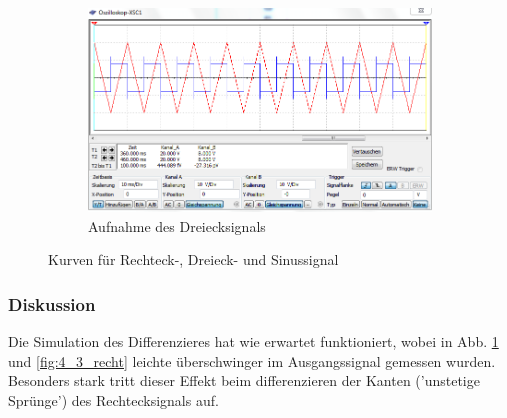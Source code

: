 \documentclass[12pt,a4paper]{article}
\begin{document}
\begin{figure}[H]
        \hfill
        \begin{subfigure}[t]{0.28\textwidth}
                \includegraphics[width=\textwidth , scale = 0.4]{4_3_drei.PNG}
                \caption[Aufnahme des Dreiecksignals]{Aufnahme des Dreiecksignals}
  				\label{fig:4_3_drei}
        \end{subfigure}
        \caption{Kurven  für Rechteck-, Dreieck- und Sinussignal}
        \label{fig:4_3}
\end{figure}

\subsubsection{Diskussion}

Die Simulation des Differenzieres hat wie erwartet funktioniert, wobei in Abb. \ref{fig:4_3_drei} und \ref{fig:4_3_recht} leichte überschwinger im Ausgangssignal gemessen wurden. Besonders stark tritt dieser Effekt beim differenzieren der Kanten ('unstetige Sprünge') des Rechtecksignals auf.
\end{document}
